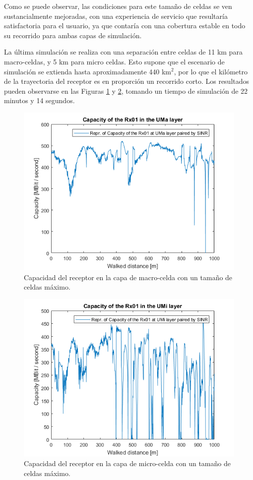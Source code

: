 Como se puede observar, las condiciones para este tamaño de celdas se ven sustancialmente mejoradas, con una experiencia de servicio que resultaría satisfactoria para el usuario, ya que contaría con una cobertura estable en todo su recorrido para ambas capas de simulación.

La última simulación se realiza con una separación entre celdas de 11 km para macro-celdas, y 5 km para micro celdas. Esto supone que el escenario de simulación se extienda hasta aproximadamente 440 km$^{2}$, por lo que el kilómetro de la trayectoria del receptor es en proporción un recorrido corto. Los resultados pueden observarse en las Figuras \ref{fig:simulacion_sep_max_uma} y  \ref{fig:simulacion_sep_max_umi}, tomando un tiempo de simulación de 22 minutos y 14 segundos.

\begin{figure}[h!]
	\centering
    \includegraphics[width=0.8\linewidth]{imagenes/6_5_capacidad_uma_max.png}
	\caption{Capacidad del receptor en la capa de macro-celda con un tamaño de celdas máximo.}
	\label{fig:simulacion_sep_max_uma}
\end{figure}

\begin{figure}[ht!]
	\centering
    \includegraphics[width=0.8\linewidth]{imagenes/6_5_capacidad_umi_max.png}
	\caption{Capacidad del receptor en la capa de micro-celda con un tamaño de celdas máximo.}
	\label{fig:simulacion_sep_max_umi}
\end{figure}

